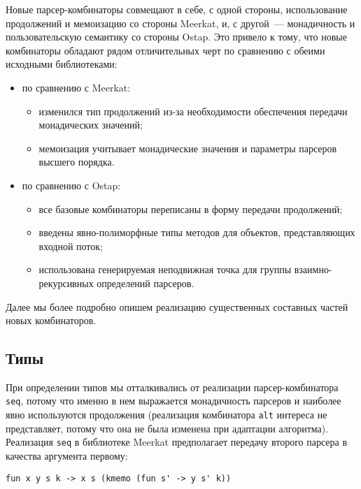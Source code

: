 \documentclass[conference]{IEEEtran}
\begin{document}
Новые парсер-комбинаторы совмещают в себе, с одной стороны, использование продолжений и мемоизацию со стороны Meerkat, и, с другой~--- монадичность и пользовательскую семантику со стороны Ostap.
Это привело к тому, что новые комбинаторы обладают рядом отличительных черт по сравнению с обеими исходными библиотеками:

\begin{itemize}
\item по сравнению с Meerkat:

\begin{itemize}
\item изменился тип продолжений из-за необходимости обеспечения передачи монадических значений;
\item мемоизация учитывает монадические значения и параметры парсеров высшего порядка.
\end{itemize}

\item по сравнению с Ostap:

\begin{itemize}
\item все базовые комбинаторы переписаны в форму передачи продолжений;
\item введены явно-полиморфные типы методов для объектов, представляющих входной поток;
\item использована генерируемая неподвижная точка для группы взаимно-рекурсивных определений парсеров.
\end{itemize}
\end{itemize}

Далее мы более подробно опишем реализацию существенных составных частей новых комбинаторов.

\subsection{Типы}

При определении типов мы отталкивались от реализации парсер-комбинатора \lstinline|seq|, потому что именно в нем выражается монадичность парсеров и наиболее явно используются продолжения
(реализация комбинатора \lstinline|alt| интереса не представляет, потому что она не была изменена при адаптации алгоритма). Реализация \lstinline|seq| в библиотеке Meerkat
предполагает передачу второго парсера в качества аргумента первому:

\begin{lstlisting}[basicstyle=\small]
   fun x y s k -> x s (kmemo (fun s' -> y s' k))
\end{lstlisting}
\end{document}
